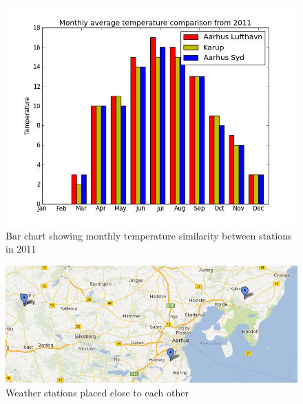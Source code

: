 \begin{figure}[H]
\centering
\includegraphics[width=0.85\linewidth,natwidth=898,natheight=587]{billeder/barChartMonthlyAverageTemperature2011.png}
\caption{Bar chart showing monthly temperature similarity between stations in 2011}
\label{fig:barChartMonthlyAverageTemperature2011}
\end{figure}

\begin{figure}[H]
\centering
\includegraphics[width=0.85\linewidth,natwidth=898,natheight=587]{billeder/KarupAarhusSydOgLufthavn.png}
\caption{Weather stations placed close to each other}
\label{fig:closeStations}
\end{figure}

